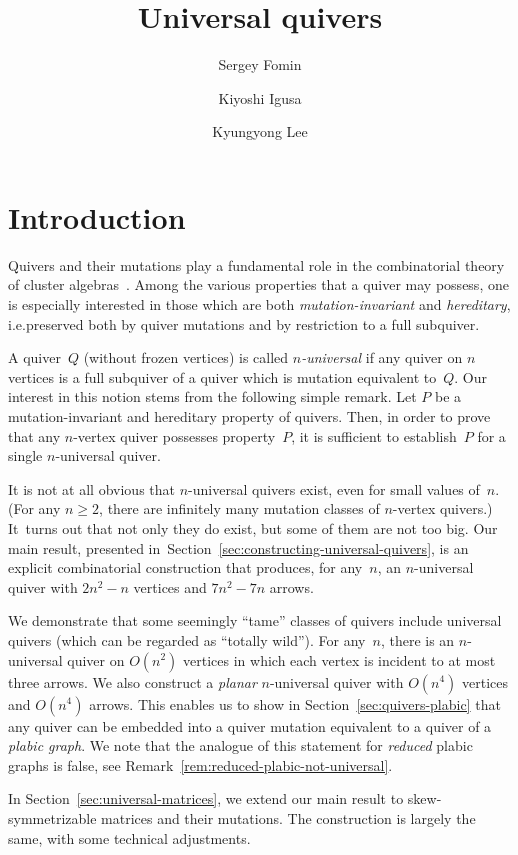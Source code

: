 \documentclass[10pt]{amsart}
\title{Universal quivers}
\author{Sergey Fomin}
\author{Kiyoshi Igusa}
\author{Kyungyong Lee}
\theoremstyle{definition}
\newcommand{\ie}{i.e.}
\begin{document}
\maketitle
\section{Introduction}




Quivers and their mutations play a fundamental role in the combinatorial theory of cluster algebras~\cite{FWZ, ca1}. Among the various properties that a quiver may possess, one is especially interested in those which are both \emph{mutation-invariant} and \emph{hereditary}, \ie preserved both by quiver mutations and by restriction to a full subquiver. 

A quiver~$Q$ (without frozen vertices) is called 
\emph{$n$-universal} if any quiver on $n$ vertices is a full subquiver of a quiver which is mutation equivalent to~$Q$. 
Our interest in this notion stems from the following simple remark. Let $P$ be a mutation-invariant and hereditary property of quivers. Then, in order to prove that any $n$-vertex quiver possesses property~$P$, it is sufficient to establish~$P$ for a single $n$-universal quiver. 

It is not at all obvious that $n$-universal quivers exist, even for small values of~$n$. 
(For any $n\ge 2$, there are infinitely many mutation classes of $n$-vertex quivers.) 
It~turns out that not only they do exist, but some of them are not too big. 
Our main result, presented in~Section~\ref{sec:constructing-universal-quivers}, is an explicit combinatorial construction that produces, for any~$n$, an $n$-universal quiver with $2n^2-n$ vertices and $7n^2-7n$ arrows. 

We demonstrate that some seemingly ``tame'' classes of quivers include universal quivers (which can be regarded as ``totally wild''). 
For any~$n$, there is an $n$-universal quiver on $O(n^2)$ vertices in which each vertex is incident to at most three arrows. 
We also construct a \emph{planar} $n$-universal quiver with $O(n^4)$ vertices and $O(n^4)$ arrows. 
This enables us to show in Section~\ref{sec:quivers-plabic} that any quiver can be embedded 
into a quiver mutation equivalent to a quiver of a \emph{plabic graph}. 
We note that the analogue of this statement for \emph{reduced} plabic graphs is false, 
see Remark~\ref{rem:reduced-plabic-not-universal}. 

In Section~\ref{sec:universal-matrices}, we extend our main result to skew-symmetrizable matrices and their mutations. The construction is largely the same, with some technical adjustments. 
\end{document}
